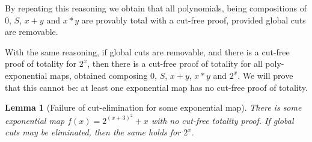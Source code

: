\documentclass[a4paper,12pt]{article}
\newtheorem{lemma}[theorem]{Lemma}
\begin{document}
By repeating this reasoning we obtain that all polynomials, being compositions of $0$, $S$, $x+y$ and $x*y$ are provably total with a cut-free proof, provided global cuts are removable. 

With the same reasoning, if global cuts are removable, and there is a cut-free proof of totality for $2^x$, then there is a cut-free proof of totality for all poly-exponential maps, obtained composing $0$, $S$, $x+y$, $x*y$ and $2^x$. We will prove that this cannot be: at least one exponential map has no cut-free proof of totality.



\begin{lemma}[Failure of cut-elimination for some exponential map]
\label{lemma-exp-failure}
There is some exponential map $f(x) = 2^{(x+3)^2}+ x$ with no cut-free totality proof. If global cuts may be eliminated, then the same holds for $2^x$.
\end{lemma}
\end{document}
